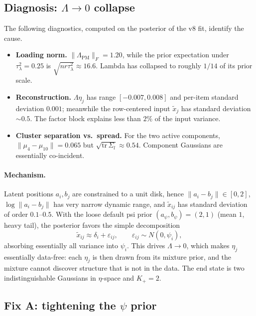 \documentclass[11pt]{article}
\begin{document}
\subsection{Diagnosis: $\Lambda\to 0$ collapse}

The following diagnostics, computed on the posterior of the v8 fit, identify the cause.

\begin{itemize}[leftmargin=1.5em]
    \item \textbf{Loading norm.} $\|\Lambda_{\mathrm{PM}}\|_F=1.20$, while the prior expectation under $\tau_\lambda^2=0.25$ is $\sqrt{n r\tau_\lambda^2}\approx 16.6$. Lambda has collapsed to roughly $1/14$ of its prior scale.
    \item \textbf{Reconstruction.} $\Lambda\eta_j$ has range $[-0.007,0.008]$ and per-item standard deviation $0.001$; meanwhile the row-centered input $\widetilde x_j$ has standard deviation $\sim 0.5$. The factor block explains less than $2\%$ of the input variance.
    \item \textbf{Cluster separation vs.~spread.} For the two active components, $\|\mu_4-\mu_{10}\|=0.065$ but $\sqrt{\mathrm{tr}\,\Sigma_l}\approx 0.54$. Component Gaussians are essentially co-incident.
\end{itemize}

\paragraph{Mechanism.}
Latent positions $a_i,b_j$ are constrained to a unit disk, hence
$\|a_i-b_j\|\in[0,2]$, $\log\|a_i-b_j\|$ has very narrow dynamic range, and
$\widetilde x_{ij}$ has standard deviation of order $0.1$--$0.5$.
With the loose default psi prior $(a_\psi,b_\psi)=(2,1)$ (mean $1$, heavy tail), the posterior favors the simple decomposition
\[
\widetilde x_{ij}\approx \delta_i + \varepsilon_{ij},\qquad \varepsilon_{ij}\sim N(0,\psi_i),
\]
absorbing essentially all variance into $\psi_i$.
This drives $\Lambda\to 0$, which makes $\eta_j$ essentially data-free: each $\eta_j$ is then drawn from its mixture prior, and the mixture cannot discover structure that is not in the data.
The end state is two indistinguishable Gaussians in $\eta$-space and $K_+=2$.

\subsection{Fix A: tightening the $\psi$ prior}\label{sec:fixA}
\end{document}
